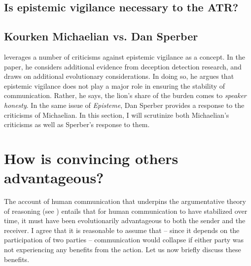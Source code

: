 
\subsection{Is epistemic vigilance necessary to the ATR?}

\subsection{Kourken Michaelian vs. Dan Sperber}

\citet{Michaelian13} leverages a number of criticisms against epistemic vigilance as a concept. In the paper, he considers additional evidence from deception detection research, and draws on additional evolutionary considerations. In doing so, he argues that epistemic vigilance does not play a major role in ensuring the stability of communication. Rather, he says, the lion's share of the burden comes to \emph{speaker honesty}. In the same issue of \emph{Episteme}, Dan Sperber \citeyear{Sperber13} provides a response to the criticisms of Michaelian. In this section, I will scrutinize both Michaelian's criticisms as well as Sperber's response to them.

\section{How is convincing others advantageous?}

The account of human communication that underpins the argumentative theory of reasoning (see \citet{Sperber01, Sperber10})
entails that for human communication to have stabilized over time, it must have been evolutionarily advantageous to both the sender and the receiver. I agree that it is reasonable to assume that -- since it depends on the participation of two parties -- communication would collapse if either party was not experiencing any benefits from the action. Let us now briefly discuss these benefits.

